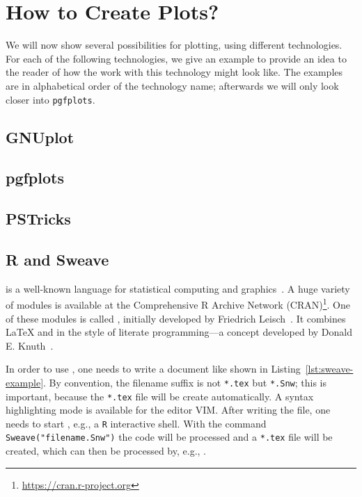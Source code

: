 \section{How to Create Plots?}

We will now show several possibilities for plotting, using different
technologies. For each of the following technologies, we give an example to
provide an idea to the reader of how the work with this technology might look
like. The examples are in alphabetical order of the technology name; afterwards
we will only look closer into \texttt{pgfplots}.

\subsection{GNUplot}

\subsection{pgfplots}

\subsection{PSTricks}

\subsection{R and Sweave}

 is a well-known language for statistical computing and
graphics~\cite{Ihaka1998}.  A huge variety of modules is available at the
Comprehensive R Archive Network (CRAN)\footnote{%
  \href{https://cran.r-project.org}{https://cran.r-project.org}}.  One of these
modules is called , initially developed by Friedrich
Leisch~\cite{Leisch2002}.  It combines \LaTeX{} and  in the style of
literate programming—a concept developed by Donald E\@. Knuth~\cite{Knuth1992}.

In order to use , one needs to write a document like shown in
Listing~\ref{lst:sweave-example}.  By convention, the filename suffix is not
\texttt{*.tex} but \texttt{*.Snw}; this is important, because the \texttt{*.tex}
file will be create automatically.  A syntax highlighting mode is available for
the editor VIM\@.  After writing the file, one needs to start ,
e.g., a \texttt{R} interactive shell.  With the command
\texttt{Sweave("filename.Snw")} the  code will be processed and a
\texttt{*.tex} file will be created, which can then be processed by, e.g.,
.

